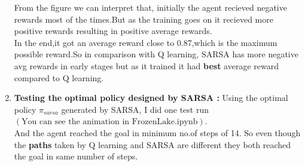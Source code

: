\documentclass[journal,12pt,onecolumn]{IEEEtran}
\theoremstyle{remark}
\numberwithin{equation}{section}
\begin{document}
\begin{enumerate}
  From the figure we can interpret that, initially the agent recieved negative rewards most of the times.But as the training goes on it recieved more positive rewards resulting in positive average rewards.\\
  In the end,it got an average reward close to 0.87,which is the maximum possible reward.So in comparison with Q learning, SARSA has more negative avg rewards in early stages but as it trained it had \textbf{best} average reward compared to Q learning.
\item \textbf{Testing the optimal policy designed by SARSA :} Using the optimal policy $\pi_{sarsa}$ generated by SARSA, I did one test run $(\text{You can see the animation in FrozenLake.ipynb})$.\\
     And the agent reached the goal in minimum no.of steps of 14. So even though the \textbf{paths} taken by Q learning and SARSA are different they both reached the goal in same number of steps.\\
   \end{enumerate}
\end{document}
